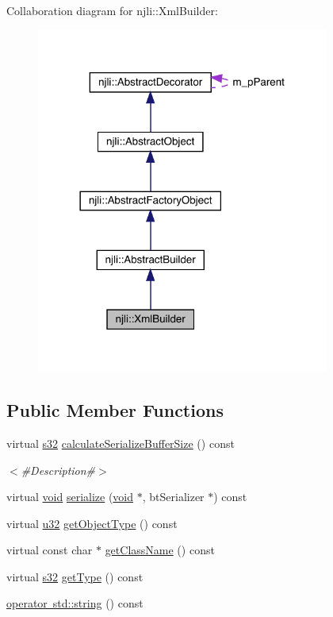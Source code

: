 Collaboration diagram for njli\+:\+:Xml\+Builder\+:\nopagebreak
\begin{figure}[H]
\begin{center}
\leavevmode
\includegraphics[width=273pt]{classnjli_1_1_xml_builder__coll__graph}
\end{center}
\end{figure}
\subsection*{Public Member Functions}
\begin{DoxyCompactItemize}
\item 
virtual \mbox{\hyperlink{_util_8h_aa62c75d314a0d1f37f79c4b73b2292e2}{s32}} \mbox{\hyperlink{classnjli_1_1_xml_builder_a79be4a310c8f7c50a0155da4623d74b5}{calculate\+Serialize\+Buffer\+Size}} () const
\begin{DoxyCompactList}\small\item\em $<$\#\+Description\#$>$ \end{DoxyCompactList}\item 
virtual \mbox{\hyperlink{_thread_8h_af1e856da2e658414cb2456cb6f7ebc66}{void}} \mbox{\hyperlink{classnjli_1_1_xml_builder_acddd1c911701604cf5f7ea135243f182}{serialize}} (\mbox{\hyperlink{_thread_8h_af1e856da2e658414cb2456cb6f7ebc66}{void}} $\ast$, bt\+Serializer $\ast$) const
\item 
virtual \mbox{\hyperlink{_util_8h_a10e94b422ef0c20dcdec20d31a1f5049}{u32}} \mbox{\hyperlink{classnjli_1_1_xml_builder_ac067a387404bdbbe3229104d06c990ff}{get\+Object\+Type}} () const
\item 
virtual const char $\ast$ \mbox{\hyperlink{classnjli_1_1_xml_builder_abc73a585be6b58a8e7d066bb513eee8c}{get\+Class\+Name}} () const
\item 
virtual \mbox{\hyperlink{_util_8h_aa62c75d314a0d1f37f79c4b73b2292e2}{s32}} \mbox{\hyperlink{classnjli_1_1_xml_builder_a1ae06385e2b3ad8ba50faf83aa907805}{get\+Type}} () const
\item 
\mbox{\hyperlink{classnjli_1_1_xml_builder_a0e61c0c42fa7c15f6f9f698a2aab5b1a}{operator std\+::string}} () const
\end{DoxyCompactItemize}
